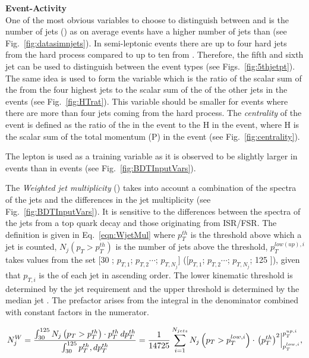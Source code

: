 \textbf{Event-Activity}\\
One of the most obvious variables to choose to distinguish between \ttbar and \tttt is the number of jets (\njets) as on average \tttt events have a higher number of jets than \ttbar (see Fig.~\ref{fig:datasimnjets}). In semi-leptonic \ttbar events there are up to four hard jets from the hard process compared to up to ten from \tttt. Therefore, the fifth and sixth jet \pt can be used to distinguish between the event types (see Figs.~\ref{fig:5thjetpt}). The same idea is used to form the variable \htrat which is the ratio of the scalar sum of the \HT from the four highest \pt jets to the scalar sum of the \HT of the other jets in the events (see Fig.~\ref{fig:HTrat}). This variable should be smaller for \tttt events where there are more than four jets coming from the hard process.
The \emph{centrality} of the event is defined as the ratio of the \HT in the event to the H in the event, where H is the scalar sum of the total momentum (P) in the event (see Fig.~\ref{fig:centrality}).

The lepton \pt is used as a training variable as it is observed to be slightly larger in \tttt events than in \ttbar events (see Fig.~\ref{fig:BDTInputVars}).

The \emph{Weighted jet multiplicity} (\njetsw) takes into account a combination of the \pt spectra of the jets and the differences in the jet multiplicity (see Fig.~\ref{fig:BDTInputVars}). It is sensitive to the differences between the \pt spectra of the jets from a top quark decay and those originating from ISR/FSR. The \njetsw definition is given in Eq.~\ref{eqn:WjetMul} where $p_T^{th}$ is the \pt threshold above which a jet is counted, $N_j\left(p_T > p_T^{th}\right)$ is the number of jets above the \pt threshold, $p_T^{low(up),i}$ takes values from the set [30 \GeV; $p_{T,1}$; $p_{T,2}\cdots$; $p_{T,N_j}$] ([$p_{T,1}$; $p_{T,2}\cdots$; $p_{T,N_j}$; 125 \GeV]), given that $p_{T,i}$ is the \pt of each jet in ascending order. The lower kinematic threshold is determined by the jet \pt requirement and the upper threshold is determined by the median jet \pt. The prefactor arises from the integral in the denominator combined with constant factors in the numerator.

\begin{equation}
N_j^W = \frac{\int_{30}^{125}{N_j\left(p_T > p_T^{th}\right)\cdot p_T^{th}\,dp_T^{th}}} {\int_{30}^{125}{ p_T^{th}\\
,dp_T^{th}}} = \frac{1}{14725}\sum_{i=1}^{N_{jets}}{N_j\left(p_T>p_T^{low,i}\right)\cdot\left.\left(p_T^{th}\right)^2\right|^{p_T^{up,i}}_{p_T^{low,i}}},  
\label{eqn:WjetMul}
\end{equation} 


